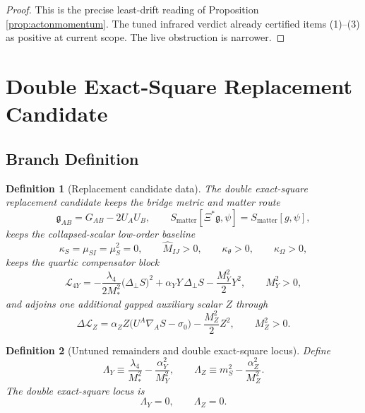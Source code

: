 \documentclass[11pt]{article}
\newcommand{\BridgeMetric}{\mathfrak{g}}
\newtheorem{definition}{Definition}
\begin{document}
\begin{proof}
This is the precise least-drift reading of Proposition \ref{prop:actonmomentum}. The tuned infrared verdict already certified items (1)--(3) as positive at current scope. The live obstruction is narrower.
\end{proof}

\section{Double Exact-Square Replacement Candidate}

\subsection{Branch Definition}

\begin{definition}[Replacement candidate data]
\label{def:branch}
The \emph{double exact-square replacement candidate} keeps the bridge metric and matter route
\begin{equation}
\BridgeMetric_{AB}=G_{AB}-2U_AU_B,
\qquad
S_{\mathrm{matter}}[\Xi^\ast\BridgeMetric,\psi]
=
S_{\mathrm{matter}}[g,\psi],
\label{eq:bridgeandmatter}
\end{equation}
keeps the collapsed-scalar low-order baseline
\begin{equation}
\kappa_S=\mu_{SI}=\mu_S^2=0,
\qquad
\widehat M_{IJ}>0,
\qquad
\kappa_\theta>0,
\qquad
\kappa_\Omega>0,
\label{eq:baseline}
\end{equation}
keeps the quartic compensator block
\begin{equation}
\mathcal L_{4Y}
=
-\frac{\lambda_4}{2M_*^2}\bigl(\Delta_\perp S\bigr)^2
+\alpha_YY\,\Delta_\perp S
-\frac{M_Y^2}{2}Y^2,
\qquad
M_Y^2>0,
\label{eq:L4Y}
\end{equation}
and adjoins one additional gapped auxiliary scalar \(Z\) through
\begin{equation}
\Delta\mathcal L_Z
=
\alpha_Z Z\bigl(U^A\nabla_A S-\sigma_0\bigr)
-\frac{M_Z^2}{2}Z^2,
\qquad
M_Z^2>0.
\label{eq:LZ}
\end{equation}
\end{definition}

\begin{definition}[Untuned remainders and double exact-square locus]
\label{def:lambdas}
Define
\begin{equation}
\Lambda_Y
\equiv
\frac{\lambda_4}{M_*^2}-\frac{\alpha_Y^2}{M_Y^2},
\qquad
\Lambda_Z
\equiv
m_S^2-\frac{\alpha_Z^2}{M_Z^2}.
\label{eq:lambdas}
\end{equation}
The \emph{double exact-square locus} is
\begin{equation}
\Lambda_Y=0,
\qquad
\Lambda_Z=0.
\label{eq:doubletuned}
\end{equation}
\end{definition}
\end{document}
